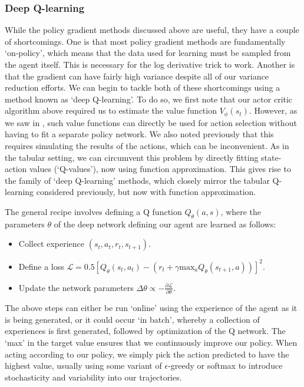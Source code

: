 

\subsubsection*{Deep Q-learning}

While the policy gradient methods discussed above are useful, they have a couple of shortcomings.
One is that most policy gradient methods are fundamentally `on-policy', which means that the data used for learning must be sampled from the agent itself.
This is necessary for the log derivative trick to work.
Another is that the gradient can have fairly high variance despite all of our variance reduction efforts.
We can begin to tackle both of these shortcomings using a method known as `deep Q-learning'.
To do so, we first note that our actor critic algorithm above required us to estimate the value function $V_\phi(s_t)$.
However, as we saw in , such value functions can directly be used for action selection without having to fit a separate policy network.
We also noted previously that this requires simulating the results of the actions, which can be inconvenient.
As in the tabular setting, we can circumvent this problem by directly fitting state-action values (`Q-values'), now using function approximation.
This gives rise to the family of `deep Q-learning' methods, which closely mirror the tabular Q-learning considered previously, but now with function approximation.

The general recipe involves defining a Q function $Q_\theta(a, s)$, where the parameters $\theta$ of the deep network defining our agent are learned as follows:
\begin{itemize}
    \item Collect experience $(s_t, a_t, r_t, s_{t+1})$.
    \item Define a loss $\mathcal{L} = 0.5 [ Q_\theta(s_t, a_t) - (r_t + \gamma \text{max}_a Q_\theta(s_{t+1}, a)) ]^2 $.
    \item Update the network parameters $\Delta \theta \propto - \frac{\partial \mathcal{L}}{\partial \theta}$.
\end{itemize}
The above steps can either be run `online' using the experience of the agent as it is being generated, or it could occur `in batch', whereby a collection of experiences is first generated, followed by optimization of the Q network.
The `max' in the target value ensures that we continuously improve our policy.
When acting according to our policy, we simply pick the action predicted to have the highest value, usually using some variant of $\epsilon$-greedy or softmax to introduce stochasticity and variability into our trajectories.

